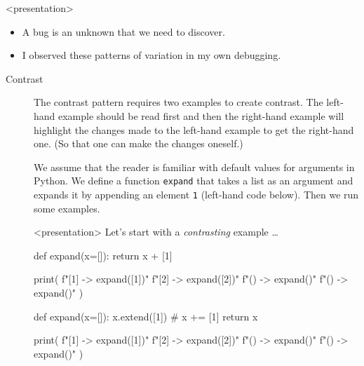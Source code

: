 \begin{frame}<presentation>
  \begin{idea}
    \begin{itemize}
      \item A bug is an unknown that we need to discover.
      \item I observed these patterns of variation in my own debugging.
    \end{itemize}
  \end{idea}
\end{frame}

\begin{description}
  \item[Contrast] The contrast pattern requires two examples to create 
    contrast.
    The left-hand example should be read first and then the right-hand 
    example will highlight the changes made to the left-hand example to get 
    the right-hand one.
    (So that one can make the changes oneself.)

    We assume that the reader is familiar with default values for arguments in 
    Python.
    We define a function \texttt{expand} that takes a list as an 
    argument and expands it by appending an element \texttt{1} 
    (left-hand code below).
    Then we run some examples.

    \begin{frame}<presentation>
      Let's start with a \emph{contrasting} example \dots
    \end{frame}

    \begin{frame}[fragile]
    \begin{minipage}[t]{0.45\columnwidth}
      \begin{pyblock}[default1]
def expand(x=[]):
  return x + [1]


print(
  f"[1] -> {expand([1])}\n"
  f"[2] -> {expand([2])}\n"
  f"()  -> {expand()}\n"
  f"()  -> {expand()}\n"
)
      \end{pyblock}
      \begin{block}{}\printpythontex[verbatim]\end{block}
    \end{minipage}
    \hfill
    \begin{minipage}[t]{0.45\columnwidth}
      \begin{pyblock}[default2][highlightlines={2-3}]
def expand(x=[]):
  x.extend([1]) # x += [1]
  return x

print(
  f"[1] -> {expand([1])}\n"
  f"[2] -> {expand([2])}\n"
  f"()  -> {expand()}\n"
  f"()  -> {expand()}\n"
)
      \end{pyblock}
      \begin{block}{}\printpythontex[verbatim][highlightlines={4}]\end{block}
    \end{minipage}
    \end{frame}


\end{description}

